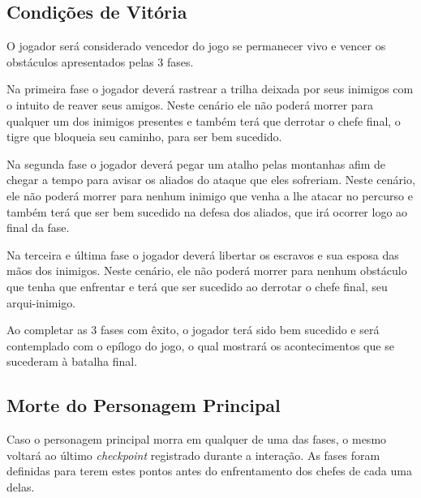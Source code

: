 \subsection{Condições de Vitória}
O jogador será considerado vencedor do jogo se permanecer vivo e vencer os obstáculos apresentados pelas 3 fases.

Na primeira fase o jogador deverá rastrear a trilha deixada por seus inimigos com o intuito de reaver seus amigos. Neste cenário ele não poderá morrer para qualquer um dos inimigos presentes e também terá que derrotar o chefe final, o tigre que bloqueia seu caminho, para ser bem sucedido.

Na segunda fase o jogador deverá pegar um atalho pelas montanhas afim de chegar a tempo para avisar os aliados do ataque que eles sofreriam. Neste cenário, ele não poderá morrer para nenhum inimigo que venha a lhe atacar no percurso e também terá que ser bem sucedido na defesa dos aliados, que irá ocorrer logo ao final da fase.

Na terceira e última fase o jogador deverá libertar os escravos e sua esposa das mãos dos inimigos. Neste cenário, ele não poderá morrer para nenhum obstáculo que tenha que enfrentar e terá que ser sucedido ao derrotar o chefe final, seu arqui-inimigo.

Ao completar as 3 fases com êxito, o jogador terá sido bem sucedido e será contemplado com o epílogo do jogo, o qual mostrará os acontecimentos que se sucederam à batalha final.

\subsection{Morte do Personagem Principal}
Caso o personagem principal morra em qualquer de uma das fases, o mesmo voltará ao último \textit{checkpoint} registrado durante a interação. As fases foram definidas para terem estes pontos antes do enfrentamento dos chefes de cada uma delas. 
